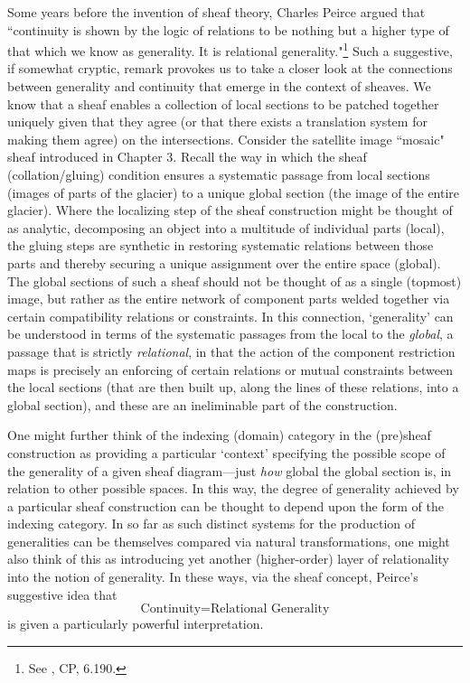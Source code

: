\documentclass[11pt]{book}
\theoremstyle{definition}
\theoremstyle{definition}
\theoremstyle{definition}
\theoremstyle{theorem}
\theoremstyle{definition}
\begin{document}
Some years before the invention of sheaf theory, Charles Peirce argued that ``continuity is shown by the logic of relations to be nothing but a higher type of that which we know as generality. It is relational generality."\footnote{See \cite{peirce_collected_1997}, CP, 6.190.} Such a suggestive, if somewhat cryptic, remark provokes us to take a closer look at the connections between generality and continuity that emerge in the context of sheaves. We know that a sheaf enables a collection of local sections to be patched together uniquely given that they agree (or that there exists a translation system for making them agree) on the intersections. Consider the satellite image ``mosaic" sheaf introduced in Chapter 3. Recall the way in which the sheaf (collation/gluing) condition ensures a systematic passage from local sections (images of parts of the glacier) to a unique global section (the image of the entire glacier). Where the localizing step of the sheaf construction might be thought of as analytic, decomposing an object into a multitude of individual parts (local), the gluing steps are synthetic in restoring systematic relations between those parts and thereby securing a unique assignment over the entire space (global). The global sections of such a sheaf should not be thought of as a single (topmost) image, but rather as the entire network of component parts welded together via certain compatibility relations or constraints. In this connection, `generality' can be understood in terms of the systematic passages from the local to the \textit{global}, a passage that is strictly \textit{relational}, in that the action of the component restriction maps is precisely an enforcing of certain relations or mutual constraints between the local sections (that are then built up, along the lines of these relations, into a global section), and these are an ineliminable part of the construction. \par 
One might further think of the indexing (domain) category in the (pre)sheaf construction as providing a particular `context' specifying the possible scope of the generality of a given sheaf diagram---just \textit{how} global the global section is, in relation to other possible spaces. In this way, the degree of generality achieved by a particular sheaf construction can be thought to depend upon the form of the indexing category. In so far as such distinct systems for the production of generalities can be themselves compared via natural transformations, one might also think of this as introducing yet another (higher-order) layer of relationality into the notion of generality. In these ways, via the sheaf concept, Peirce's suggestive idea that 
\begin{equation*}
\text{Continuity} = \text{Relational Generality}
\end{equation*}  
is given a particularly powerful interpretation. 
\end{document}
